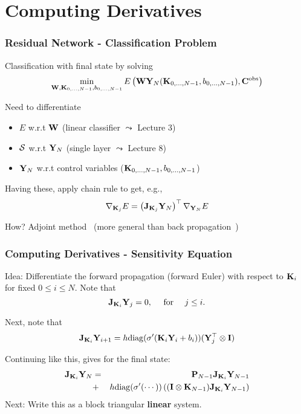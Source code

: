 \documentclass[12pt,fleqn,handout]{beamer}
\begin{document}
\section{Computing Derivatives} %
\begin{frame}[fragile]\frametitle{Residual Network - Classification Problem}


Classification with final state by solving
$$ \min_{{\bf W}, {\bf K}_{0,\ldots,N-1},b_{0,\ldots,N-1}}E\left(
{\bf W} {\bf Y}_N({\bf K}_{0,\ldots,N-1},b_{0,\ldots,N-1}),{\bf C}^{\rm obs}\right) $$

\bigskip
\pause

Need to differentiate
\begin{itemize}
\item $E$ w.r.t ${\bf W}$ (linear classifier $\leadsto$ Lecture 3)

\item ${\cal S}$ w.r.t ${\bf Y}_N$ (single layer $\leadsto$ Lecture 8)

\item ${\bf Y}_N$ w.r.t control variables (${\bf K}_{0,\ldots,N-1},b_{0,\ldots,N-1}$)
\end{itemize}

\bigskip
\pause

Having these, apply chain rule to get, e.g.,
$$
\nabla_{{\bf K}_j} E =  \left({\bf J}_{{\bf K}_j} {{\bf Y}_N}\right)^{\top} \nabla_{{\bf Y}_N} E
$$

How? Adjoint method~\cite{bliss1919,BorzSchulz2012} (more general than back propagation~\cite{Rumelhart1986})
\end{frame}


\begin{frame}[fragile]\frametitle{Computing Derivatives - Sensitivity Equation}
Idea: Differentiate the forward propagation (forward Euler) with respect to ${\bf K}_i$ for fixed  $0\leq i \leq N$. Note that
$$
	{\bf J}_{{\bf K}_i} {\bf Y}_j = 0, \quad \text{ for } \quad j\leq i. 
$$

\smallskip
\pause

Next, note that 
$$
{\bf J}_{{\bf K}_i} {\bf Y}_{i+1} = h {\rm diag}(\sigma'( {\bf K}_i {\bf Y}_i + b_i))
(  {\bf Y}_j^\top \otimes {\bf I})
$$

\smallskip
\pause

Continuing like this, gives for the final state:
\begin{eqnarray*}
{\bf J}_{{\bf K}_i}{\bf Y}_{N} & =& {\bf P}_{N-1}  {\bf J}_{{\bf K}_i}{\bf Y}_{N-1}  \\
	&  +& h {\rm diag}(\sigma'( \cdots)) \left( ( {\bf I} \otimes {\bf K}_{N-1}) {\bf J}_{{\bf K}_i}{\bf Y}_{N-1}\right) 
\end{eqnarray*}
\smallskip
\pause
Next: Write this as a block triangular {\bf linear} system.
\end{frame}
\end{document}
